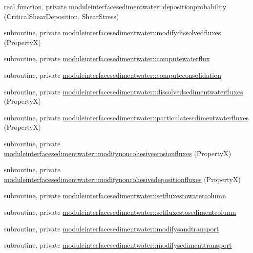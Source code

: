 \begin{DoxyCompactItemize}
real function, private \mbox{\hyperlink{namespacemoduleinterfacesedimentwater_a0e44cb6bef52ac05cfb4ad24e8715a5d}{moduleinterfacesedimentwater\+::depositionprobability}} (Critical\+Shear\+Deposition, Shear\+Stress)
\item 
subroutine, private \mbox{\hyperlink{namespacemoduleinterfacesedimentwater_ac7453c783a3170a319fb2e8f0bc6af3b}{moduleinterfacesedimentwater\+::modifydissolvedfluxes}} (PropertyX)
\item 
subroutine, private \mbox{\hyperlink{namespacemoduleinterfacesedimentwater_a53be621f24e2efe413055d68cd165ba9}{moduleinterfacesedimentwater\+::computewaterflux}}
\item 
subroutine, private \mbox{\hyperlink{namespacemoduleinterfacesedimentwater_a488a986c36aca3233969de75a2e2094e}{moduleinterfacesedimentwater\+::computeconsolidation}}
\item 
subroutine, private \mbox{\hyperlink{namespacemoduleinterfacesedimentwater_a892fef59c88570196d680f581deef4a9}{moduleinterfacesedimentwater\+::dissolvedsedimentwaterfluxes}} (PropertyX)
\item 
subroutine, private \mbox{\hyperlink{namespacemoduleinterfacesedimentwater_a1ea77fd3a708c35c8d23bb864a94a0ad}{moduleinterfacesedimentwater\+::particulatesedimentwaterfluxes}} (PropertyX)
\item 
subroutine, private \mbox{\hyperlink{namespacemoduleinterfacesedimentwater_a3ed9cede4da99e95712c02f4a8a6408a}{moduleinterfacesedimentwater\+::modifynoncohesiveerosionfluxes}} (PropertyX)
\item 
subroutine, private \mbox{\hyperlink{namespacemoduleinterfacesedimentwater_a9d8d2c2895ffd32b4cc15bfff20e9f7f}{moduleinterfacesedimentwater\+::modifynoncohesivedepositionfluxes}} (PropertyX)
\item 
subroutine, private \mbox{\hyperlink{namespacemoduleinterfacesedimentwater_a9c3a165d2ddf84d84404172f34db61ab}{moduleinterfacesedimentwater\+::setfluxestowatercolumn}}
\item 
subroutine, private \mbox{\hyperlink{namespacemoduleinterfacesedimentwater_a1493bc1b914a1c9424edba0cd5747eef}{moduleinterfacesedimentwater\+::setfluxestosedimentcolumn}}
\item 
subroutine, private \mbox{\hyperlink{namespacemoduleinterfacesedimentwater_acec4b1c4e1750f68a29c778c4dff4dad}{moduleinterfacesedimentwater\+::modifysandtransport}}
\item 
subroutine, private \mbox{\hyperlink{namespacemoduleinterfacesedimentwater_af8d259ce72d65a152ca86349e82463f1}{moduleinterfacesedimentwater\+::modifysedimenttransport}}

\end{DoxyCompactItemize}
